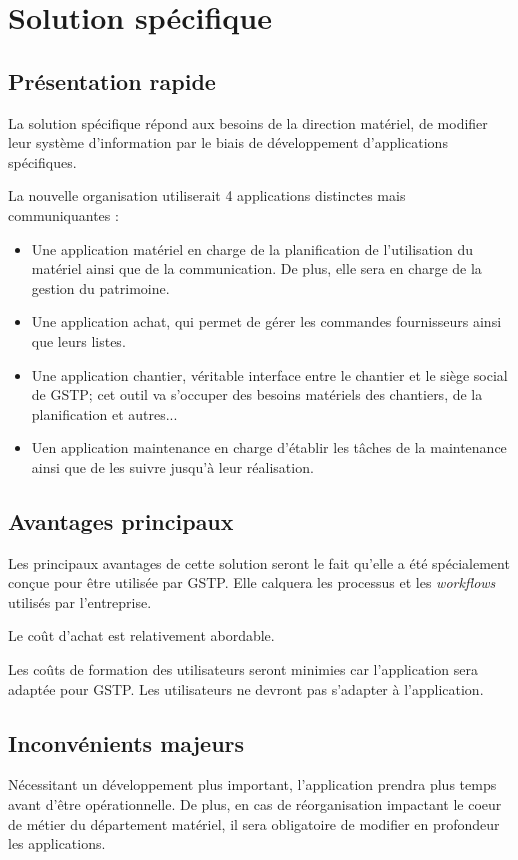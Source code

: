 \section{Solution spécifique}

\subsection{Présentation rapide}

La solution spécifique répond aux besoins de la direction matériel, de modifier
leur système d'information par le biais de développement d'applications spécifiques.

La nouvelle organisation utiliserait 4 applications distinctes mais communiquantes : 
\begin{itemize}
\item Une application matériel en charge de la planification de l'utilisation du 
matériel ainsi que de la communication. De plus, elle sera en charge de la gestion du 
patrimoine.
\item Une application achat, qui permet de gérer les commandes fournisseurs ainsi que
leurs listes.
\item Une application chantier, véritable interface entre le chantier et le siège 
social de GSTP; cet outil va s'occuper des besoins matériels des chantiers, de la planification et autres...
\item Uen application maintenance en charge d'établir les tâches de la maintenance ainsi que de les suivre 
jusqu'à leur réalisation.
\end{itemize}

\subsection{Avantages principaux}

Les principaux avantages de cette solution seront le fait qu'elle a été spécialement
conçue pour être utilisée par GSTP. Elle calquera les processus et les {\sl workflows}
utilisés par l'entreprise.

Le coût d'achat est relativement abordable.

Les coûts de formation des utilisateurs seront minimies car l'application sera 
adaptée pour GSTP. Les utilisateurs ne devront pas s'adapter à l'application.

\subsection{Inconvénients majeurs}

Nécessitant un développement plus important, l'application prendra plus temps
avant d'être opérationnelle. De plus, en cas de réorganisation
impactant le coeur de métier du département matériel, il sera obligatoire de modifier
en profondeur les applications. 

